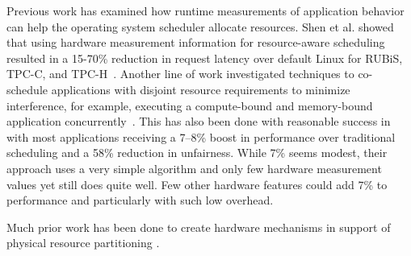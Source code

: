 Previous work has examined how runtime measurements of application
behavior can help the operating system scheduler allocate resources.
Shen et al. showed that using hardware measurement information for
resource-aware scheduling resulted in a 15-70\% reduction in request
latency over default Linux for RUBiS, TPC-C, and
TPC-H~\cite{shen08counters}.  Another line of work investigated
techniques to co-schedule applications with disjoint resource
requirements to minimize interference, for example, executing a
compute-bound and memory-bound application
concurrently~\cite{thread_clustering,unc,shen08counters,hotos_perfcount}.
 This has
 also been done with reasonable success in~\cite{hotos_perfcount} with
 most applications receiving a 7--8\% boost in performance over
 traditional scheduling and a 58\% reduction in unfairness.  While 7\%
 seems modest, their approach uses a very simple algorithm and only few
 hardware measurement values yet still does quite well.  Few other
 hardware features could add 7\% to performance and particularly with
 such low overhead.

 Much prior work has been done to create hardware mechanisms in support of physical resource partitioning \cite{876484,967444,1194855,1086328,605420,1152161,1331730, 1241608,gsf,1250671,1194858,1275005,1088154,1318096,1399982,1399973, 1069998}.








